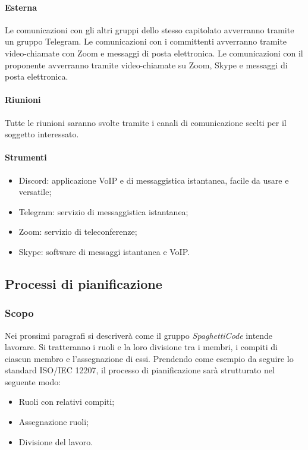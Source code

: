 \documentclass[../norme_di_progetto.tex]{subfiles}
\begin{document}
        \paragraph{Esterna}
        Le comunicazioni con gli altri gruppi dello stesso capitolato avverranno tramite un gruppo Telegram.
        Le comunicazioni con i committenti avverranno tramite video-chiamate con Zoom e messaggi di posta elettronica.
        Le comunicazioni con il proponente avverranno tramite video-chiamate su Zoom, Skype e messaggi di posta elettronica.
        \paragraph{Riunioni}
        Tutte le riunioni saranno svolte tramite i canali di comunicazione scelti per il soggetto interessato. 
        \paragraph{Strumenti}
        \begin{itemize}
            \item Discord: applicazione VoIP e di messaggistica istantanea, facile da usare e versatile;
            \item Telegram: servizio di messaggistica istantanea;
            \item Zoom: servizio di teleconferenze;
            \item Skype: software di messaggi istantanea e VoIP.
        \end{itemize}

\subsection{Processi di pianificazione}
    \subsubsection{Scopo}
    Nei prossimi paragrafi si descriverà come il gruppo \emph{SpaghettiCode} intende lavorare. Si tratteranno i ruoli e la loro divisione tra i membri, i compiti di ciascun membro e l'assegnazione di essi. Prendendo come esempio da seguire lo standard ISO/IEC 12207, il processo di pianificazione sarà strutturato nel seguente modo:
    \begin{itemize}
        \item Ruoli con relativi compiti;
        \item Assegnazione ruoli;
        \item Divisione del lavoro.
    \end{itemize}
\end{document}
